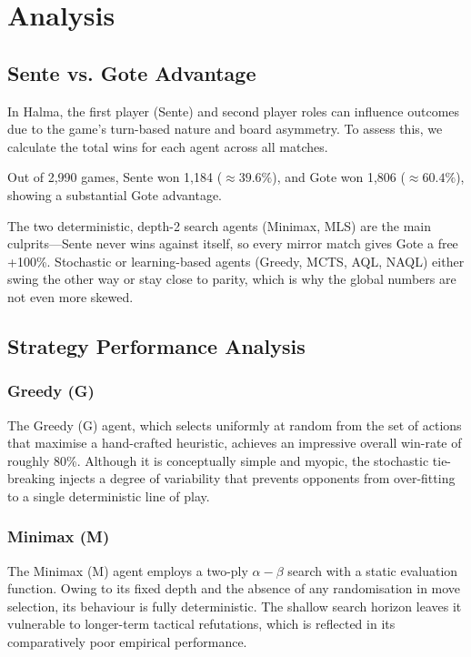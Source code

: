 \section{Analysis}

\subsection{Sente vs. Gote Advantage}
In Halma, the first player (Sente) and second player roles can influence outcomes due to the game's turn-based nature and board asymmetry. To assess this, we calculate the total wins for each agent across all matches.

Out of 2,990 games, Sente won 1,184 ($\approx 39.6\%$), and Gote won 1,806 ($\approx 60.4\%$), showing a substantial Gote advantage.

The two deterministic, depth-2 search agents (Minimax, MLS) are the main culprits—Sente never wins against itself, so every mirror match gives Gote a free +100\%. Stochastic or learning-based agents (Greedy, MCTS, AQL, NAQL) either swing the other way or stay close to parity, which is why the global numbers are not even more skewed.

\subsection{Strategy Performance Analysis}

\subsubsection{Greedy (G)}
The Greedy (G) agent, which selects uniformly at random from the set of actions that maximise a hand-crafted heuristic, achieves an impressive overall win-rate of roughly 80\%. Although it is conceptually simple and myopic, the stochastic tie-breaking injects a degree of variability that prevents opponents from over-fitting to a single deterministic line of play.

\subsubsection{Minimax (M)}
The Minimax (M) agent employs a two-ply $\alpha - \beta$ search with a static evaluation function. Owing to its fixed depth and the absence of any randomisation in move selection, its behaviour is fully deterministic. The shallow search horizon leaves it vulnerable to longer-term tactical refutations, which is reflected in its comparatively poor empirical performance.

